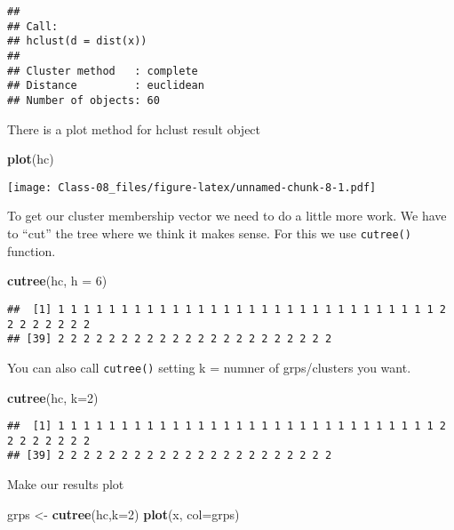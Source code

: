 \documentclass[]{article}
\newenvironment{Shaded}{\begin{snugshade}}{\end{snugshade}}
\newcommand{\DataTypeTok}[1]{\textcolor[rgb]{0.13,0.29,0.53}{#1}}
\newcommand{\DecValTok}[1]{\textcolor[rgb]{0.00,0.00,0.81}{#1}}
\newcommand{\KeywordTok}[1]{\textcolor[rgb]{0.13,0.29,0.53}{\textbf{#1}}}
\newcommand{\NormalTok}[1]{#1}
\newcommand{\StringTok}[1]{\textcolor[rgb]{0.31,0.60,0.02}{#1}}
\begin{document}
\begin{verbatim}
## 
## Call:
## hclust(d = dist(x))
## 
## Cluster method   : complete 
## Distance         : euclidean 
## Number of objects: 60
\end{verbatim}

There is a plot method for hclust result object

\begin{Shaded}
\begin{Highlighting}[]
\KeywordTok{plot}\NormalTok{(hc)}
\end{Highlighting}
\end{Shaded}

\texttt{[image: Class-08\_files/figure-latex/unnamed-chunk-8-1.pdf]}

To get our cluster membership vector we need to do a little more work.
We have to ``cut'' the tree where we think it makes sense. For this we
use \texttt{cutree()} function.

\begin{Shaded}
\begin{Highlighting}[]
\KeywordTok{cutree}\NormalTok{(hc, }\DataTypeTok{h =} \DecValTok{6}\NormalTok{)}
\end{Highlighting}
\end{Shaded}

\begin{verbatim}
##  [1] 1 1 1 1 1 1 1 1 1 1 1 1 1 1 1 1 1 1 1 1 1 1 1 1 1 1 1 1 1 1 2 2 2 2 2 2 2 2
## [39] 2 2 2 2 2 2 2 2 2 2 2 2 2 2 2 2 2 2 2 2 2 2
\end{verbatim}

You can also call \texttt{cutree()} setting k = numner of grps/clusters
you want.

\begin{Shaded}
\begin{Highlighting}[]
\KeywordTok{cutree}\NormalTok{(hc, }\DataTypeTok{k=}\DecValTok{2}\NormalTok{)}
\end{Highlighting}
\end{Shaded}

\begin{verbatim}
##  [1] 1 1 1 1 1 1 1 1 1 1 1 1 1 1 1 1 1 1 1 1 1 1 1 1 1 1 1 1 1 1 2 2 2 2 2 2 2 2
## [39] 2 2 2 2 2 2 2 2 2 2 2 2 2 2 2 2 2 2 2 2 2 2
\end{verbatim}

Make our results plot

\begin{Shaded}
\begin{Highlighting}[]
\NormalTok{grps <-}\StringTok{ }\KeywordTok{cutree}\NormalTok{(hc,}\DataTypeTok{k=}\DecValTok{2}\NormalTok{)}
\KeywordTok{plot}\NormalTok{(x, }\DataTypeTok{col=}\NormalTok{grps)}
\end{Highlighting}
\end{Shaded}
\end{document}
